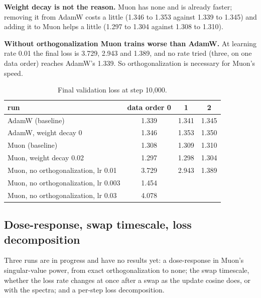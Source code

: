 \documentclass[10pt]{article}
\begin{document}
\textbf{Weight decay is not the reason.} Muon has none and is already faster; removing it from AdamW costs a little (1.346 to 1.353 against 1.339 to 1.345) and adding it to Muon helps a little (1.297 to 1.304 against 1.308 to 1.310).

\textbf{Without orthogonalization Muon trains worse than AdamW.} At learning rate 0.01 the final loss is 3.729, 2.943 and 1.389, and no rate tried (three, on one data order) reaches AdamW's 1.339. So orthogonalization is necessary for Muon's speed.

\begin{table}[H]
\centering
\small
\caption{Final validation loss at step 10{,}000.}
\label{tab:ablate}
\begin{tabular}{l ccc}
\toprule
run & data order 0 & 1 & 2 \\
\midrule
AdamW (baseline)                 & 1.339 & 1.341 & 1.345 \\
AdamW, weight decay 0            & 1.346 & 1.353 & 1.350 \\
\midrule
Muon (baseline)                  & 1.308 & 1.309 & 1.310 \\
Muon, weight decay 0.02          & 1.297 & 1.298 & 1.304 \\
\midrule
Muon, no orthogonalization, lr 0.01           & 3.729 & 2.943 & 1.389 \\
Muon, no orthogonalization, lr 0.003          & 1.454 &       &       \\
Muon, no orthogonalization, lr 0.03           & 4.078 &       &       \\
\bottomrule
\end{tabular}
\end{table}

\subsection{Dose-response, swap timescale, loss decomposition}
\label{sec:dose}

Three runs are in progress and have no results yet: a dose-response in Muon's singular-value power, from exact orthogonalization to none; the swap timescale, whether the loss rate changes at once after a swap as the update cosine does, or with the spectra; and a per-step loss decomposition.
\end{document}
